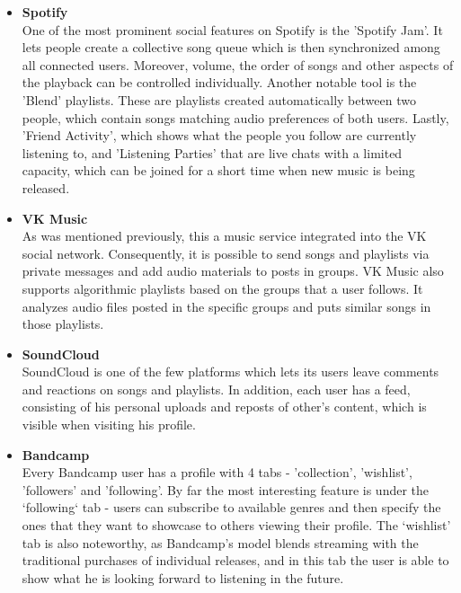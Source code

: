 \begin{itemize}
    \item \textbf{Spotify} \\
    One of the most prominent social features on Spotify is the 'Spotify Jam'\cite{spotify_jam}.
    It lets people create a collective song queue which is then synchronized among all connected users.
    Moreover, volume, the order of songs and other aspects of the playback can be controlled individually.
    Another notable tool is the 'Blend' playlists\cite{spotify_recs}. These are playlists created automatically
    between two people, which contain songs matching audio preferences of both users.
    Lastly, 'Friend Activity'\cite{spotify_friend_activ}, which shows what the people you follow are currently listening to,
    and 'Listening Parties' that are live chats with a limited capacity,
    which can be joined for a short time when new music is being released\cite{spotify_party_1,spotify_party_2}.

    \item \textbf{VK Music} \\
    As was mentioned previously, this a music service integrated into the VK social network.
    Consequently, it is possible to send songs and playlists via private messages and add audio materials to
    posts in groups. VK Music also supports algorithmic playlists based on the groups that a user follows.
    It analyzes audio files posted in the specific groups and puts similar songs in those playlists.

    \item \textbf{SoundCloud} \\
    SoundCloud is one of the few platforms which lets its users leave comments
    and reactions on songs and playlists\cite{sc_comments,sc_reactions}.
    In addition, each user has a feed, consisting of his personal uploads and
    reposts of other's content\cite{sc_reposts}, which is visible when visiting his profile.

    \item \textbf{Bandcamp} \\
    Every Bandcamp user has a profile with 4 tabs - 'collection', 'wishlist', 'followers' and 'following'.
    By far the most interesting feature is under the `following` tab - users can subscribe to available genres and then
    specify the ones that they want to showcase to others viewing their profile.
    The ‘wishlist’ tab is also noteworthy,
    as Bandcamp’s model blends streaming with the traditional purchases of individual releases, and
    in this tab the user is able to show what he is looking forward to listening in the future.
\end{itemize}


